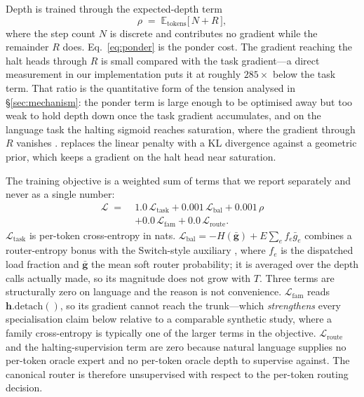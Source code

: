Depth is trained through the expected-depth term
{\dispsize
\begin{equation}
\rho \;=\; \mathbb{E}_{\text{tokens}}\big[\,N + R\,\big],
\label{eq:ponder}
\end{equation}
}
where the step count $N$ is discrete and contributes no gradient while the
remainder $R$ does. Eq.~\ref{eq:ponder} is the ponder cost. The gradient reaching
the halt heads through $R$ is small compared with the task gradient---a direct
measurement in our implementation puts it at roughly $285\times$ below the task
term. That ratio is the quantitative form of the tension analysed in
\S\ref{sec:mechanism}: the ponder term is large enough to be optimised away but
too weak to hold depth down once the task gradient accumulates, and on the
language task the halting sigmoid reaches saturation, where the gradient through
$R$ vanishes \citep{graves2016act}.
\citet{banino2021pondernet} replaces the linear penalty with a KL divergence
against a geometric prior, which keeps a gradient on the halt head near
saturation.

The training objective is a weighted sum of terms that we report separately and
never as a single number:
{\dispsize
\begin{equation}
\begin{aligned}
\mathcal{L} \;=\;& 1.0\,\mathcal{L}_{\text{task}}
   + 0.001\,\mathcal{L}_{\text{bal}} + 0.001\,\rho \\
  &+ 0.0\,\mathcal{L}_{\text{fam}} + 0.0\,\mathcal{L}_{\text{route}} .
\end{aligned}
\label{eq:loss}
\end{equation}
}
$\mathcal{L}_{\text{task}}$ is per-token cross-entropy in nats.
$\mathcal{L}_{\text{bal}} = -H(\bar{\mathbf{g}}) + E\sum_e f_e \bar{g}_e$ combines
a router-entropy bonus with the Switch-style auxiliary \citep{fedus2022switch},
where $f_e$ is the dispatched load fraction and $\bar{\mathbf{g}}$ the mean soft
router probability; it is averaged over the depth calls actually made, so its
magnitude does not grow with $T$. Three terms are structurally zero on language
and the reason is not convenience. $\mathcal{L}_{\text{fam}}$ reads
$\mathbf{h}.\mathrm{detach}()$, so its gradient cannot reach the trunk---which
\emph{strengthens} every specialisation claim below relative to a comparable
synthetic study, where a family cross-entropy is typically one of the larger terms
in the objective. $\mathcal{L}_{\text{route}}$ and the halting-supervision term are
zero because natural language supplies no per-token oracle expert and no per-token
oracle depth to supervise against. The canonical router is therefore unsupervised
with respect to the per-token routing decision.

